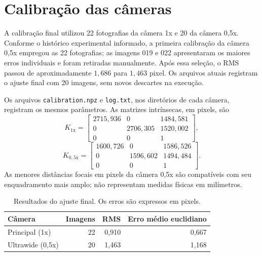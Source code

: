 \section{Calibração das câmeras}

A calibração final utilizou 22 fotografias da câmera 1x e 20 da câmera 0,5x.
Conforme o histórico experimental informado, a primeira calibração da câmera
0,5x empregou as 22 fotografias; as imagens 019 e 022 apresentaram
os maiores erros individuais e foram retiradas manualmente. Após essa seleção,
o RMS passou de aproximadamente $1{,}686$ para $1{,}463$ pixel. Os arquivos
atuais registram o ajuste final com 20 imagens, sem novos descartes na execução.

Os arquivos \texttt{calibration.npz} e \texttt{log.txt}, nos diretórios de cada
câmera, registram os mesmos parâmetros. As matrizes intrínsecas, em pixels, são
\begin{equation}
K_{1\mathrm{x}}=
\begin{bmatrix}
2715{,}936 & 0 & 1484{,}581\\
0 & 2706{,}305 & 1520{,}002\\
0 & 0 & 1
\end{bmatrix},
\label{eq:k1}
\end{equation}
\begin{equation}
K_{0{,}5\mathrm{x}}=
\begin{bmatrix}
1600{,}726 & 0 & 1586{,}526\\
0 & 1596{,}602 & 1494{,}484\\
0 & 0 & 1
\end{bmatrix}.
\label{eq:k05}
\end{equation}
As menores distâncias focais em pixels da câmera 0,5x são compatíveis com seu
enquadramento mais amplo; não representam medidas físicas em milímetros.

\begin{table}[H]
  \centering
  \caption{Resultados do ajuste final. Os erros são expressos em pixels.}
  \label{tab:calibration}
  \begin{tabular}{lrrr}
    \toprule
    Câmera & Imagens & RMS & Erro médio euclidiano\\
    \midrule
    Principal (1x) & 22 & 0,910 & 0,667\\
    Ultrawide (0,5x) & 20 & 1,463 & 1,168\\
    \bottomrule
  \end{tabular}
\end{table}

